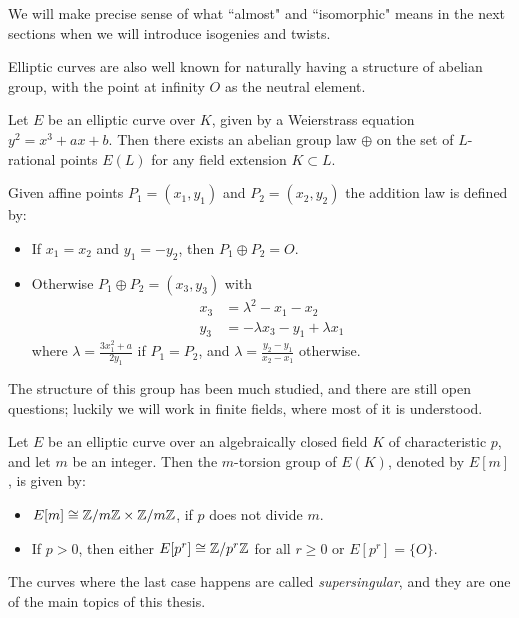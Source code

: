 We will make precise sense of what ``almost" and ``isomorphic" means in the next sections when we will introduce isogenies and twists.

Elliptic curves are also well known for naturally having a structure of abelian group, with the point at infinity $O$ as the neutral element.

\begin{theorem}
    Let $E$ be an elliptic curve over $K$, given by a Weierstrass equation $y^2=x^3+ax+b$. Then there exists an abelian group law $\oplus$ on the set of $L$-rational points $E(L)$ for any field extension $K\subset L$.
    
    Given affine points $P_1=(x_1,y_1)$ and $P_2=(x_2,y_2)$ the addition law is defined by:
    \begin{itemize}
        \item If $x_1=x_2$ and $y_1=-y_2$, then $P_1\oplus P_2=O$.
        \item Otherwise $P_1\oplus P_2=(x_3,y_3)$ with \begin{align*}
            x_3 &=  \lambda^2-x_1-x_2\\
            y_3 &= -\lambda x_3-y_1+\lambda x_1
        \end{align*}
        where $\lambda=\frac{3x_1^2+a}{2y_1}$ if $P_1=P_2$, and $\lambda=\frac{y_2-y_1}{x_2-x_1}$ otherwise.
    \end{itemize}
\end{theorem}

The structure of this group has been much studied, and there are still open questions; luckily we will work in finite fields, where most of it is understood.

\begin{theorem}
    Let $E$ be an elliptic curve over an algebraically closed field $K$ of characteristic $p$, and let $m$ be an integer. Then the $m$-torsion group of $E(K)$, denoted by $E[m]$, is given by:
    \begin{itemize}
        \item $E[m]\cong \mathbb{Z}/m\mathbb{Z}\times\mathbb{Z}/m\mathbb{Z}$, if $p$ does not divide $m$.
        \item If $p>0$, then either $E[p^r]\cong\mathbb{Z}/p^r\mathbb{Z}$ for all $r\ge0$ or $E[p^r]=\{O\}$.
    \end{itemize}
\end{theorem}

The curves where the last case happens are called \emph{supersingular}, and they are one of the main topics of this thesis.

